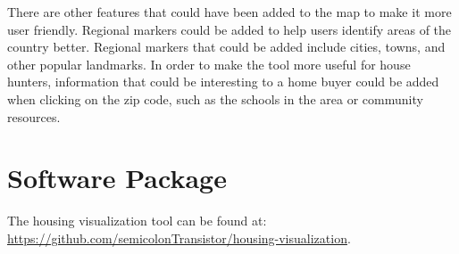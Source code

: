 \documentclass{article}
\begin{document}
There are other features that could have been added to the map to make it more user friendly. Regional markers could be added to help users identify areas of the country better. Regional markers that could be added include cities, towns, and other popular landmarks. In order to make the tool more useful for house hunters, information that could be interesting to a home buyer could be added when clicking on the zip code, such as the schools in the area or community resources.

\section{Software Package}
The housing visualization tool can be found at: \url {https://github.com/semicolonTransistor/housing-visualization}.
\end{document}
